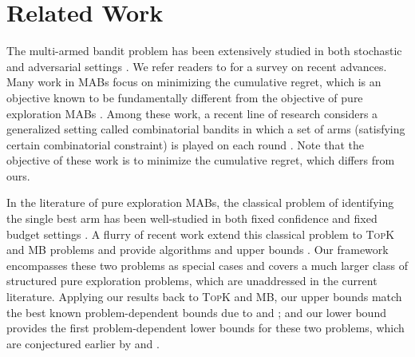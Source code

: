 \documentclass{article}
\newcommand{\MultiIdent}{\textsc{TopK}\xspace}
\newcommand{\MultiBandit}{\textsc{MB}\xspace}
\begin{document}
\section{Related Work}

The multi-armed bandit problem has been extensively studied in both stochastic and adversarial settings \citep{lai1985asymptotically,auer2002nonstochastic,auer2002nonstochastic}.
We refer readers to \citep{bubeck2012regret} for a survey on recent advances.
Many work in MABs focus on minimizing the cumulative regret, which is an objective known to be fundamentally different from the objective of pure exploration MABs \citep{bubeck2010pure}.
Among these work, a recent line of research considers a generalized setting called combinatorial bandits in which a set of arms (satisfying certain combinatorial constraint) is played on each round \citep{cesa2012combinatorial,chen2013combinatorial,kale2010non,neu2010online,audibert2009minimax,Bubeck12towardsminimax}.
Note that the objective of these work is to minimize the cumulative regret, which differs from ours.

In the literature of pure exploration MABs, the classical problem of identifying the single best arm has been well-studied in both fixed confidence and fixed budget settings \citep{mannor2004sample,bubeck2010pure,audibert2010best,gabillon2012best,jamieson2013lil,jamieson2014best}.
A flurry of recent work extend this classical problem to \MultiIdent and \MultiBandit problems and provide algorithms and upper bounds \citep{kalyanakrishnan2010efficient,kalyanakrishnan2012pac,zhou2014optimal,bubeck2013multiple,NIPS2011_4478,gabillon2012best}.
Our framework encompasses these two problems as special cases and covers a much larger class of structured pure exploration problems, which are unaddressed in the current literature.
Applying our results back to \MultiIdent and \MultiBandit, our upper bounds match the best known problem-dependent bounds due to \citet{gabillon2012best} and \citet{bubeck2013multiple}; and our lower bound provides the first problem-dependent lower bounds for these two problems, which are conjectured earlier by \citet{kalyanakrishnan2012pac} and \citet{bubeck2013multiple}.
\end{document}
